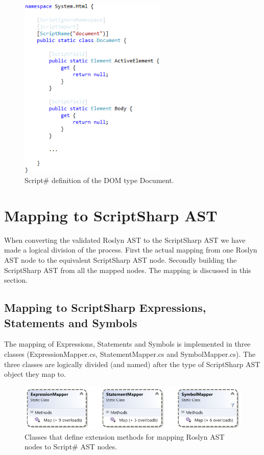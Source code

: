 		\begin{figure}[H]
				\includegraphics[width=7cm]{resources/images/Document.png}
			\caption{Script\# definition of the DOM type Document.}
			\label{fig:document}
		\end{figure}




\section{Mapping to ScriptSharp AST} %
\label{sec:mapping_to_scriptsharp_ast}
	When converting the validated Roslyn AST to the ScriptSharp AST we have made a logical division of the process. First the actual mapping from one Roslyn AST node to the equivalent ScriptSharp AST node. Secondly building the ScriptSharp AST from all the mapped nodes. The mapping is discussed in this section. 

	\subsection{Mapping to ScriptSharp Expressions, Statements and Symbols} %
	\label{sub:subsection_mapping_to_scriptsharp_expressions_statements_and_symbols}
		The mapping of Expressions, Statements and Symbols is implemented in three classes (ExpressionMapper.cs, StatementMapper.cs and SymbolMapper.cs). The three classes are logically divided (and named) after the type of ScriptSharp AST object they map to. 

		\begin{figure}[H]
			\begin{center}
				\centerline{\includegraphics[width=14cm]{resources/images/MapperClasses.png}}
			\end{center}
			\caption{Classes that define extension methods for mapping Roslyn AST nodes to Script\# AST nodes.}
			\label{mapperClasses}
		\end{figure}

